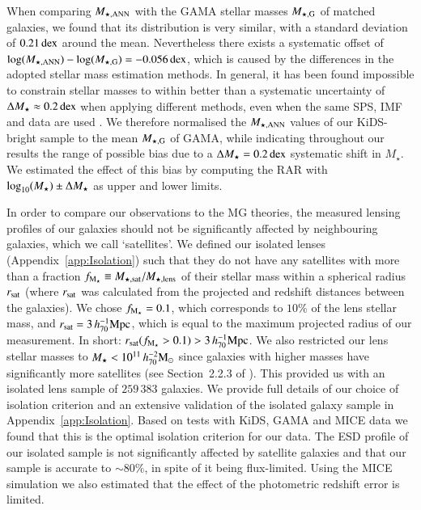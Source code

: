 \documentclass{aa}
\newcommand{\hmsun}{\,h_{70}^{-2} {\rm M_\odot}}
\newcommand{\hMpc}{\,h_{70}^{-1}{\rm{Mpc}} }
\newcommand{\dex}{\,{\rm dex}}
\renewcommand{\Updelta}{{\rm \Delta}}
\newcommand{\un}[1]{_{\rm #1}}
\begin{document}
When comparing $M\un{\star,ANN}$ with the GAMA stellar masses $M\un{\star,G}$ of matched galaxies, we found that its distribution is very similar, with a standard deviation of $0.21 \dex$ around the mean. Nevertheless there exists a systematic offset of $\log(M\un{\star,ANN}) - \log(M\un{\star,G}) = -0.056 \dex$, which is caused by the differences in the adopted stellar mass estimation methods. In general, it has been found impossible to constrain stellar masses to within better than a systematic uncertainty of $\Updelta M_\star \approx 0.2 \dex$ when applying different methods, even when the same SPS, IMF and data are used \cite[]{taylor2011,wright2017}. We therefore normalised the $M\un{\star,ANN}$ values of our KiDS-bright sample to the mean $M\un{\star,G}$ of GAMA, while indicating throughout our results the range of possible bias due to a $\Updelta M_\star = 0.2 \dex$ systematic shift in $M_\star$. We estimated the effect of this bias by computing the RAR with $\log_{10}(M_\star)\pm\Updelta M_\star$ as upper and lower limits.

In order to compare our observations to the MG theories, the measured lensing profiles of our galaxies should not be significantly affected by neighbouring galaxies, which we call `satellites'. We defined our isolated lenses (Appendix~\ref{app:Isolation}) such that they do not have any satellites with more than a fraction $f\un{M_\star} \equiv M\un{\star,sat}/M\un{\star,lens}$ of their stellar mass within a spherical radius $r\un{sat}$ (where $r\un{sat}$ was calculated from the  projected and redshift distances between the galaxies). We chose $f\un{M_\star}=0.1$, which corresponds to $10\%$ of the lens stellar mass, and $r\un{sat}=3\hMpc$, which is equal to the maximum projected radius of our measurement. In short: $r\un{sat}(f\un{M_\star}>0.1)>3\hMpc$. We also restricted our lens stellar masses to $M_\star < 10^{11} \hmsun$ since galaxies with higher masses have significantly more satellites (see Section~2.2.3 of \citealp{brouwer2017}). This provided us with an isolated lens sample of $259\,383$ galaxies. We provide full details of our choice of isolation criterion and an extensive validation of the isolated galaxy sample in Appendix~\ref{app:Isolation}. Based on tests with KiDS, GAMA and MICE data we found that this is the optimal isolation criterion for our data. The ESD profile of our isolated sample is not significantly affected by satellite galaxies and that our sample is accurate to $\sim80\%$, in spite of it being flux-limited. Using the MICE simulation we also estimated that the effect of the photometric redshift error is limited.
\end{document}

